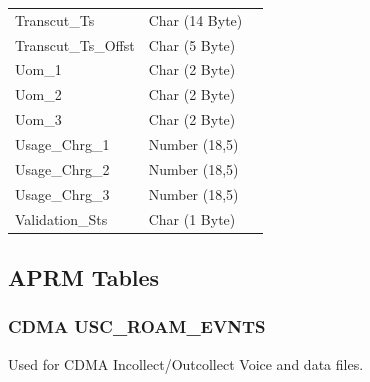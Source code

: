 \documentclass[12pt,twoside]{article}
\begin{document}
\begin{longtable}{l|l|l}
Transcut\_Ts & Char (14 Byte) & \\
Transcut\_Ts\_Offst & Char (5 Byte) & \\
Uom\_1 & Char (2 Byte) & \\
Uom\_2 & Char (2 Byte) & \\
Uom\_3 & Char (2 Byte) & \\
Usage\_Chrg\_1 & Number (18,5) & \\
Usage\_Chrg\_2 & Number (18,5) & \\
Usage\_Chrg\_3 & Number (18,5) & \\
Validation\_Sts & Char (1 Byte) & \\
\hline
\end{longtable}

\normalsize
\subsection{APRM Tables}
\label{sec:orgheadline135}
\subsubsection{CDMA USC\_ROAM\_EVNTS}
\label{sec:orgheadline130}
Used for CDMA Incollect/Outcollect Voice and data files.
\footnotesize
\end{document}
